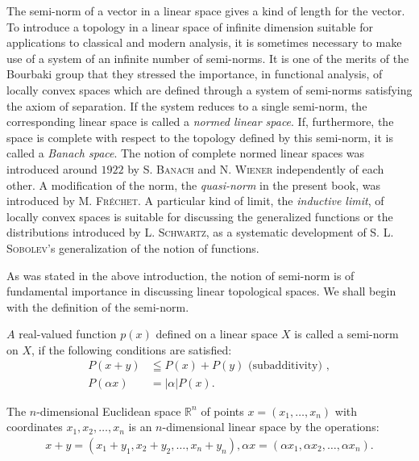 \label{chap:I}

The semi-norm of a vector in a linear space gives a kind of length for the vector. To introduce a topology in a linear space of infinite dimension suitable for applications to classical and modern analysis, it is sometimes necessary to make use of a system of an infinite number of semi-norms. It is one of the merits of the Bourbaki group that they stressed the importance, in functional analysis, of locally convex spaces which are defined through a system of semi-norms satisfying the axiom of separation. If the system reduces to a single semi-norm, the corresponding linear space is called a \emph{normed linear space}. If, furthermore, the space is complete with respect to the topology defined by this semi-norm, it is called a \emph{Banach space}. The notion of complete normed linear spaces was introduced around $1922$ by S. \textsc{Banach} and N. \textsc{Wiener} independently of each other. A modification of the norm, the \emph{quasi-norm} in the present book, was introduced by M. \textsc{Fréchet}. A particular kind of limit, the \emph{inductive limit}, of locally convex spaces is suitable for discussing the generalized functions or the distributions introduced by L. \textsc{Schwartz}, as a systematic development of S. L. \textsc{Sobolev}'s generalization of the notion of functions. 


\label{sec:I.1}

As was stated in the above introduction, the notion of semi-norm is of fundamental importance in discussing linear topological spaces. We shall begin with the definition of the semi-norm. 

\begin{definition}\label{def:I.1.Definition.1} $A$ real-valued function $p(x)$ defined on a linear space $X$ is called a semi-norm on $X$, if the following conditions are satisfied: 
 \begin{align}
 P(x + y) &\leqq P(x) + P(y) \text{ (subadditivity) }, \label{eq:I.1.1} \\
 P(\alpha x) &= | \alpha | P(x). \label{eq:I.1.2}
 \end{align}
\end{definition}


\begin{example}\label{ex:I.1.Example.1} The $n$-dimensional Euclidean space $\mathbb{R}^{n}$ of points $x = (x_{1}, \ldots, x_{n})$ with coordinates $x_{1}, x_{2}, \ldots, x_{n}$ is an $n$-dimensional linear space by the operations: 
 \[
\begin{gathered}
x + y = (x_{1} + y_{1}, x_{2} + y_{2}, \dots , x_{n} + y_{n}), \alpha x = (\alpha x_{1}, \alpha x_{2}, \dots , \alpha x_{n}).
\end{gathered}
\]
\end{example}


